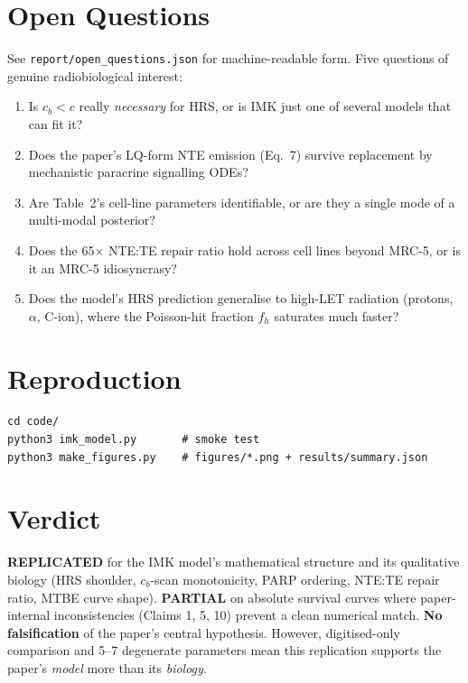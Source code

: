 \documentclass[11pt]{article}
\begin{document}
\section{Open Questions}
See \texttt{report/open\_questions.json} for machine-readable form.
Five questions of genuine radiobiological interest:
\begin{enumerate}
  \item Is $c_b<c$ really \emph{necessary} for HRS, or is IMK just
    one of several models that can fit it?
  \item Does the paper's LQ-form NTE emission (Eq.~7) survive
    replacement by mechanistic paracrine signalling ODEs?
  \item Are Table~2's cell-line parameters identifiable, or are they
    a single mode of a multi-modal posterior?
  \item Does the 65$\times$ NTE:TE repair ratio hold across cell
    lines beyond MRC-5, or is it an MRC-5 idiosyncrasy?
  \item Does the model's HRS prediction generalise to high-LET
    radiation (protons, $\alpha$, C-ion), where the Poisson-hit
    fraction $f_h$ saturates much faster?
\end{enumerate}

\section{Reproduction}
\begin{verbatim}
cd code/
python3 imk_model.py       # smoke test
python3 make_figures.py    # figures/*.png + results/summary.json
\end{verbatim}

\section{Verdict}
\textbf{REPLICATED} for the IMK model's mathematical structure and its
qualitative biology (HRS shoulder, $c_b$-scan monotonicity, PARP
ordering, NTE:TE repair ratio, MTBE curve shape). \textbf{PARTIAL} on
absolute survival curves where paper-internal inconsistencies (Claims 1,
5, 10) prevent a clean numerical match. \textbf{No falsification} of the
paper's central hypothesis. However, digitised-only comparison and 5--7
degenerate parameters mean this replication supports the paper's
\emph{model} more than its \emph{biology}.
\end{document}
